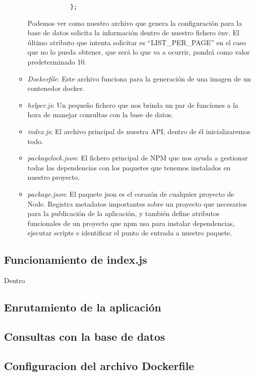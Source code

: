 \begin{itemize}
\begin{itemize}
\begin{verbatim}
            };
        \end{verbatim}
        \begin{tcolorbox}
            [colback=green!5!white,colframe=green!75!black,fonttitle=\bfseries,title=Utilización del archivo .env]
            Podemos ver como nuestro archivo que genera la configuración para la base de datos solicita la información dentro de nuestro fichero \.env. El último atributo que intenta solicitar es ``LIST\_PER\_PAGE'' en el caso que no lo pueda obtener, que será lo que va a ocurrir, pondrá como valor predeterminado 10.
        \end{tcolorbox}
        \item \textit{Dockerfile}: Este archivo funciona para la generación de una imagen de un contenedor docker.
        \item \textit{helper.js}: Un pequeño fichero que nos brinda un par de funciones a la hora de manejar consultas con la base de datos.
        \item \textit{index.js}: El archivo principal de nuestra API, dentro de él inicializaremos todo.
        \item \textit{package\-lock.json}: El fichero principal de NPM que nos ayuda a gestionar todas las dependencias con los paquetes que tenemos instalados en nuestro proyecto.
        \item \textit{package.json}: El paquete json es el corazón de cualquier proyecto de Node. Registra metadatos importantes sobre un proyecto que necesarios para la publicación de la aplicación, y también define atributos funcionales de un proyecto que npm usa para instalar dependencias, ejecutar scripts e identificar el punto de entrada a nuestro paquete.
    \end{itemize}
\end{itemize}

\subsection{Funcionamiento de index.js}
Dentro

\subsection{Enrutamiento de la aplicación}

\subsection{Consultas con la base de datos}

\subsection{Configuracion del archivo Dockerfile}